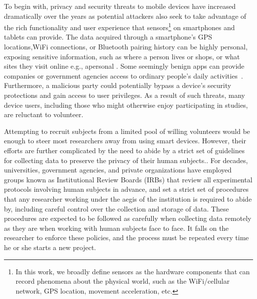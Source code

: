 To begin with, privacy and security threats to mobile devices have
increased dramatically over the years as potential attackers also seek
to take advantage of the rich functionality and user experience that
sensors\footnote{\scriptsize In this work, we broadly define sensors
as the hardware components that can record phenomena about the
physical world, such as the WiFi/cellular network, GPS location,
movement acceleration, etc.} on smartphones and tablets can provide.
The data acquired through a smartphone's GPS locations,WiFi
connections, or Bluetooth pairing history can be highly personal,
exposing sensitive information, such as where a person lives or shops,
or what sites they visit online e.g., apersonal
\cite{han2012accomplice}. Some seemingly benign apps  can provide companies or government agencies access to
ordinary people's daily activities~\cite{AngryBirds}. Furthermore, a
malicious party could potentially bypass a device's security
protections and gain access to user privileges. As a result of such
threats, many device users, including those who might otherwise enjoy
participating in studies, are reluctant to volunteer.

Attempting to recruit subjects from a limited pool of willing
volunteers would be enough to steer most researchers away from using
smart devices. However, their efforts are further complicated by the
need to abide by a strict set of guidelines for collecting data to
preserve the privacy of their human subjects.. For decades,
universities, government agencies, and private organizations have
employed groups known as Institutional Review Boards (IRBs) that
review all experimental protocols involving human subjects in advance,
and set a strict set of procedures that any researcher working under
the aegis of the institution is required to abide by, including
careful control over the collection and storage of data. These
procedures are expected to be followed as carefully when collecting
data remotely as they are when working with human subjects face to
face. It falls on the researcher to enforce these policies, and the
process must be repeated every time he or she starts a new project.

